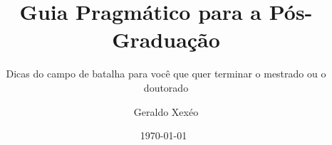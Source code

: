 \documentclass[fontsize=12pt,open=any, a4paper,pagesize=auto,toc=listof,twoside,chapterprefix=false,appendixprefix=true]{scrbook}
\title{Guia Pragmático para a Pós-Graduação}
\subtitle{Dicas do campo de batalha para você que quer terminar o mestrado ou o doutorado}
\author{Geraldo Xexéo}
\date{\today~\currenttime}
\begin{document}
\maketitle







\frontmatter
\tableofcontents
\listoffigures
\listoftables

\mainmatter
















~%










\printindex

\printbibliography
%
\appendix


\backmatter
\end{document}
